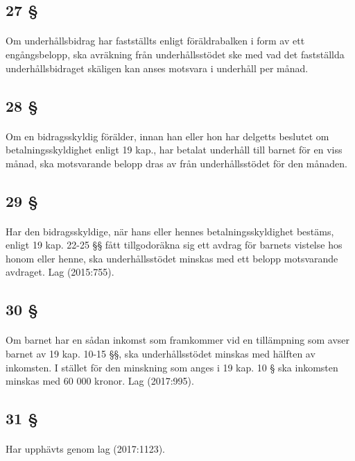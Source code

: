 \documentclass[a4paper,notitlepage,openany,10pt]{book}
\begin{document}
\subsection*{27 §}
\paragraph*{}
Om underhållsbidrag har fastställts enligt föräldrabalken i form av ett engångsbelopp, ska avräkning från underhållsstödet ske med vad det fastställda underhållsbidraget skäligen kan anses motsvara i underhåll per månad.
\subsection*{28 §}
\paragraph*{}
Om en bidragsskyldig förälder, innan han eller hon har delgetts beslutet om betalningsskyldighet enligt 19 kap., har betalat underhåll till barnet för en viss månad, ska motsvarande belopp dras av från underhållsstödet för den månaden.
\subsection*{29 §}
\paragraph*{}
Har den bidragsskyldige, när hans eller hennes betalningsskyldighet bestäms, enligt 19 kap. 22-25 §§ fått tillgodoräkna sig ett avdrag för barnets vistelse hos honom eller henne, ska underhållsstödet minskas med ett belopp motsvarande avdraget.
Lag (2015:755).
\subsection*{30 §}
\paragraph*{}
Om barnet har en sådan inkomst som framkommer vid en tillämpning som avser barnet av 19 kap. 10-15 §§, ska underhållsstödet minskas med hälften av inkomsten. I stället för den minskning som anges i 19 kap. 10 § ska inkomsten minskas med 60 000 kronor.
Lag (2017:995).
\subsection*{31 §}
\paragraph*{}
Har upphävts genom
lag (2017:1123).
\end{document}
